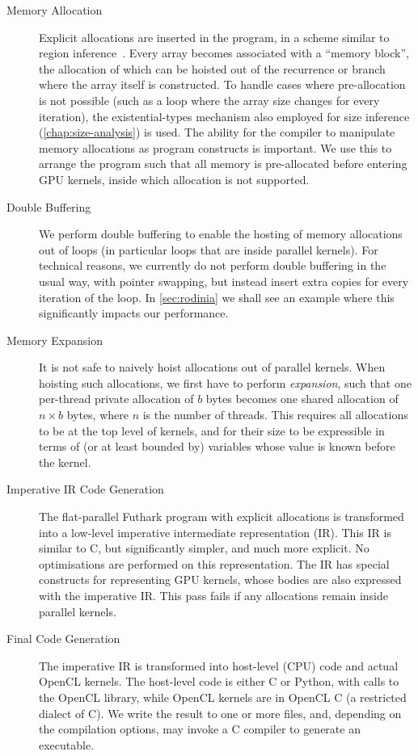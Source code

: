 \begin{description}
\item[Memory Allocation] Explicit allocations are inserted in
the program, in a scheme similar to region
inference~\cite{mlkit_retrospective}.  Every array becomes associated
with a ``memory block'', the allocation of which can be hoisted out of
the recurrence or branch where the array itself is constructed.  To
handle cases where pre-allocation is not possible (such as a loop
where the array size changes for every iteration), the
existential-types mechanism also employed for size inference
(\cref{chap:size-analysis}) is used.  The ability for the compiler to
manipulate memory allocations as program constructs is important.  We
use this to arrange the program such that all memory is pre-allocated
before entering GPU kernels, inside which allocation is not supported.

\item[Double Buffering] We perform double buffering to enable
the hosting of memory allocations out of loops (in particular loops
that are inside parallel kernels).  For technical reasons, we
currently do not perform double buffering in the usual way, with
pointer swapping, but instead insert extra copies for every iteration
of the loop.  In \cref{sec:rodinia} we shall see an example where this
significantly impacts our performance.

\item[Memory Expansion] It is not safe to naively hoist
allocations out of parallel kernels.  When hoisting such allocations,
we first have to perform \textit{expansion}, such that one per-thread
private allocation of $b$ bytes becomes one shared allocation of
$n\times{}b$ bytes, where $n$ is the number of threads.  This requires
all allocations to be at the top level of kernels, and for their size
to be expressible in terms of (or at least bounded by) variables whose
value is known before the kernel.

\item[Imperative IR Code Generation] The flat-parallel Futhark
program with explicit allocations is transformed into a low-level
imperative intermediate representation (IR).  This IR is similar to C,
but significantly simpler, and much more explicit.  No optimisations
are performed on this representation.  The IR has special constructs
for representing GPU kernels, whose bodies are also expressed with the
imperative IR.  This pass fails if any allocations remain inside
parallel kernels.

\item[Final Code Generation] The imperative IR is transformed
into host-level (CPU) code and actual OpenCL kernels.  The host-level
code is either C or Python, with calls to the OpenCL library, while
OpenCL kernels are in OpenCL C (a restricted dialect of C).  We write
the result to one or more files, and, depending on the compilation
options, may invoke a C compiler to generate an executable.
\end{description}

